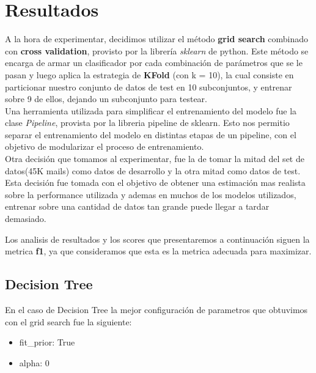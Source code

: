 \newcommand\MyBox[2]{
  \fbox{\lower0.75cm
    \vbox to 1.7cm{\vfil
      \hbox to 1.7cm{\hfil\parbox{1.4cm}{#1\\#2}\hfil}
      \vfil}%
  }%
}

\noindent
\renewcommand\arraystretch{1.5}
\setlength\tabcolsep{0pt}

\section{Resultados}
A la hora de experimentar, decidimos utilizar el método \textbf{grid search} combinado con \textbf{cross validation}, provisto por la librería \textit{sklearn} de python.
Este método se encarga de armar un clasificador por cada combinación de parámetros que se le pasan y luego aplica la estrategia de \textbf{KFold} (con k = 10), la cual
consiste en particionar nuestro conjunto de datos de test en 10 subconjuntos, y entrenar sobre 9 de ellos, dejando un subconjunto para testear.\\

Una herramienta utilizada para simplificar el entrenamiento del modelo fue la clase \textit{Pipeline}, provista por la
libreria pipeline de sklearn. Esto nos permitio separar el entrenamiento del modelo en distintas etapas de un pipeline,
con el objetivo de modularizar el proceso de entrenamiento. \\

Otra decisión que tomamos al experimentar, fue la de tomar la mitad del set de datos(45K mails) como datos de desarrollo y la otra mitad como datos
de test. Esta decisión fue tomada con el objetivo de obtener una estimación mas realista sobre la performance utilizada y ademas en muchos de los modelos
utilizados, entrenar sobre una cantidad de datos tan grande puede llegar a tardar demasiado.

Los analisis de resultados y los scores que presentaremos a continuación siguen la metrica \textbf{f1}, ya que consideramos
que esta es la metrica adecuada para maximizar.

\subsection{Decision Tree}
En el caso de Decision Tree la mejor configuración de parametros que obtuvimos con el grid search fue la siguiente:
\begin{itemize}
\item{fit\_prior: True}
\item{alpha: 0}
\end{itemize}

